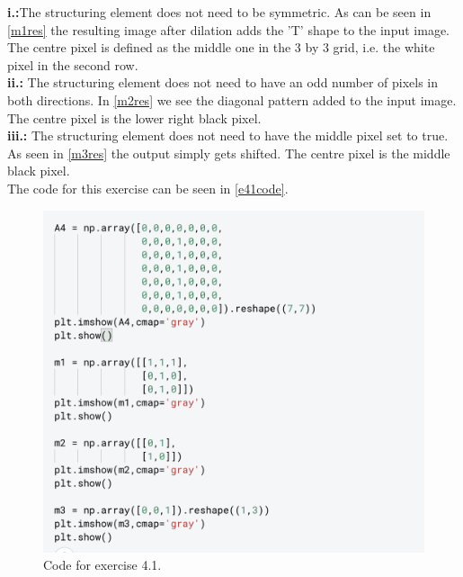 \textbf{i.:}The structuring element does not need to be symmetric. As can be seen in \autoref{m1res} the resulting image after dilation adds the 'T' shape to the input image. The centre pixel is defined as the middle one in the 3 by 3 grid, i.e. the white pixel in the second row.\\
\textbf{ii.:} The structuring element does not need to have an odd number of pixels in both directions. In \autoref{m2res} we see the diagonal pattern added to the input image. The centre pixel is the lower right black pixel.\\
\textbf{iii.:} The structuring element does not need to have the middle pixel set to true. As seen in \autoref{m3res} the output simply gets shifted. The centre pixel is the middle black pixel.\\
The code for this exercise can be seen in \autoref{e41code}.
\begin{figure}[H]
	\centering
	\includegraphics[width=0.7\linewidth]{Materials/e41code}
	\caption{Code for exercise 4.1.}
	\label{e41code}
\end{figure}


